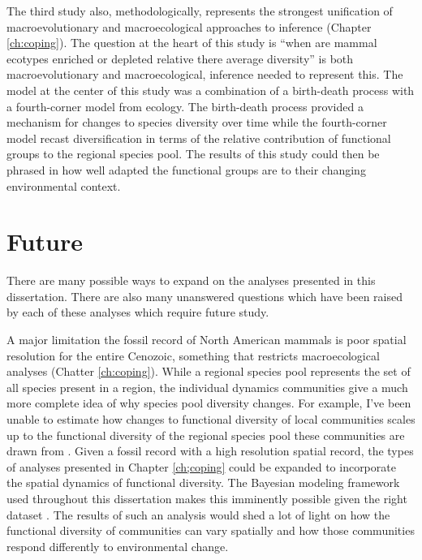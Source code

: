 The third study also, methodologically, represents the strongest unification of macroevolutionary and macroecological approaches to inference (Chapter \ref{ch:coping}). The question at the heart of this study is ``when are mammal ecotypes enriched or depleted relative there average diversity'' is both macroevolutionary and macroecological, inference needed to represent this. The model at the center of this study was a combination of a birth-death process with a fourth-corner model from ecology. The birth-death process provided a mechanism for changes to species diversity over time while the fourth-corner model recast diversification in terms of the relative contribution of functional groups to the regional species pool. The results of this study could then be phrased in how well adapted the functional groups are to their changing environmental context.



\section{Future}

There are many possible ways to expand on the analyses presented in this dissertation. There are also many unanswered questions which have been raised by each of these analyses which require future study.

A major limitation the fossil record of North American mammals is poor spatial resolution for the entire Cenozoic, something that restricts macroecological analyses (Chatter \ref{ch:coping}). While a regional species pool represents the set of all species present in a region, the individual dynamics communities give a much more complete idea of why species pool diversity changes. For example, I've been unable to estimate how changes to functional diversity of local communities scales up to the functional diversity of the regional species pool these communities are drawn from \citep{Harrison2008}. Given a fossil record with a high resolution spatial record, the types of analyses presented in Chapter \ref{ch;coping} could be expanded to incorporate the spatial dynamics of functional diversity. The Bayesian modeling framework used throughout this dissertation makes this imminently possible given the right dataset \citep{Banerjee2004}. The results of such an analysis would shed a lot of light on how the functional diversity of communities can vary spatially and how those communities respond differently to environmental change.

